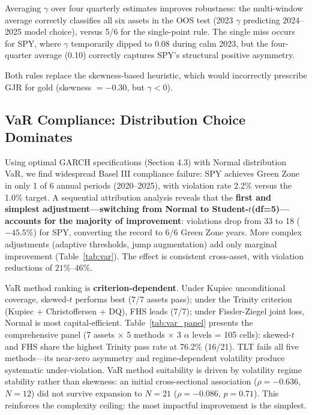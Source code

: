 Averaging $\gamma$ over four quarterly estimates improves robustness: the multi-window average correctly classifies all six assets in the OOS test (2023 $\gamma$ predicting 2024--2025 model choice), versus 5/6 for the single-point rule. The single miss occurs for SPY, where $\gamma$ temporarily dipped to 0.08 during calm 2023, but the four-quarter average (0.10) correctly captures SPY's structural positive asymmetry.

Both rules replace the skewness-based heuristic, which would incorrectly prescribe GJR for gold (skewness $= -0.30$, but $\gamma < 0$).


\subsection{VaR Compliance: Distribution Choice Dominates}

Using optimal GARCH specifications (Section 4.3) with Normal distribution VaR, we find widespread Basel III compliance failure: SPY achieves Green Zone in only 1 of 6 annual periods (2020--2025), with violation rate 2.2\% versus the 1.0\% target. A sequential attribution analysis reveals that the \textbf{first and simplest adjustment---switching from Normal to Student-$t$(df=5)---accounts for the majority of improvement}: violations drop from 33 to 18 ($-45.5\%$) for SPY, converting the record to 6/6 Green Zone years. More complex adjustments (adaptive thresholds, jump augmentation) add only marginal improvement (Table~\ref{tab:var}). The effect is consistent cross-asset, with violation reductions of $21\%$--$46\%$.

VaR method ranking is \textbf{criterion-dependent}. Under Kupiec unconditional coverage, skewed-$t$ performs best (7/7 assets pass); under the Trinity criterion (Kupiec + Christoffersen + DQ), FHS leads (7/7); under Fissler-Ziegel joint loss, Normal is most capital-efficient. Table~\ref{tab:var_panel} presents the comprehensive panel (7 assets $\times$ 5 methods $\times$ 3 $\alpha$ levels = 105 cells): skewed-$t$ and FHS share the highest Trinity pass rate at 76.2\% (16/21). TLT fails all five methods---its near-zero asymmetry and regime-dependent volatility produce systematic under-violation. VaR method suitability is driven by volatility regime stability rather than skewness: an initial cross-sectional association ($\rho = -0.636$, $N = 12$) did not survive expansion to $N = 21$ ($\rho = -0.086$, $p = 0.71$). This reinforces the complexity ceiling: the most impactful improvement is the simplest.

